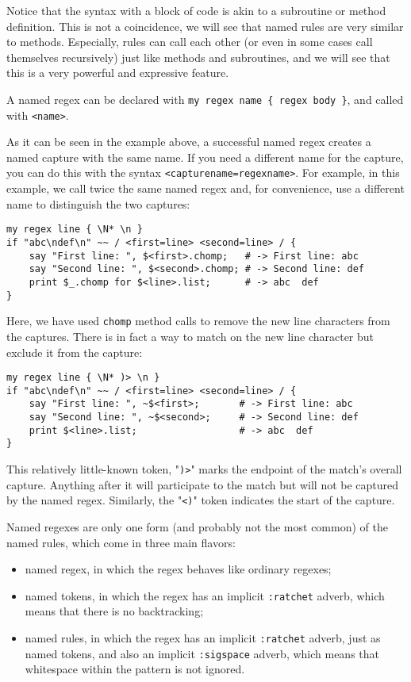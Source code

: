 Notice that the syntax with a block of code is akin 
to a subroutine or method definition. This is not a 
coincidence, we will see that named rules are very 
similar to methods. Especially, rules can call 
each other (or even in some cases call themselves 
recursively) just like methods and subroutines, and we will see 
that this is a very powerful and expressive feature.

A named regex can be declared with 
\verb'my regex name { regex body }', and called with 
{\tt <name>}. 

As it can be seen in the example above, a successful named 
regex creates a named capture with the same name. If you 
need a different name for the capture, you can do this 
with the syntax {\tt <capturename=regexname>}. For example,
in this example, we call twice the same named regex and, 
for convenience, use a different name to distinguish 
the two captures:

\begin{verbatim}
my regex line { \N* \n }
if "abc\ndef\n" ~~ / <first=line> <second=line> / {
    say "First line: ", $<first>.chomp;   # -> First line: abc
    say "Second line: ", $<second>.chomp; # -> Second line: def
    print $_.chomp for $<line>.list;      # -> abc  def
}
\end{verbatim}

Here, we have used {\tt chomp} method calls to remove 
the new line characters from the captures. There is in 
fact a way to match on the new line character but exclude 
it from the capture:
\begin{verbatim}
my regex line { \N* )> \n }
if "abc\ndef\n" ~~ / <first=line> <second=line> / {
    say "First line: ", ~$<first>;       # -> First line: abc
    say "Second line: ", ~$<second>;     # -> Second line: def
    print $<line>.list;                  # -> abc  def
}
\end{verbatim}

This relatively little-known token, "\verb')>'" marks 
the endpoint of the match's overall capture. Anything 
after it will participate to the match but will not 
be captured by the named regex. Similarly, the "\verb'<)'" 
token indicates the start of the capture.

Named regexes are only one form (and probably not the 
most common) of the named rules, which 
come in three main flavors:
\begin{itemize}
\item named regex, in which the regex behaves like ordinary 
regexes;
\item named tokens, in which the regex has an implicit 
{\tt :ratchet} adverb, which means that there is no 
backtracking;
\item named rules, in which the regex has an implicit 
{\tt :ratchet} adverb, just as named tokens, and also 
an implicit {\tt :sigspace} adverb, which means that 
whitespace within the pattern is not ignored.
\end{itemize}

